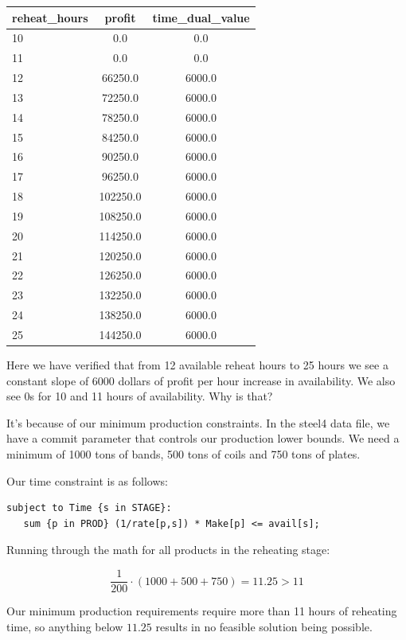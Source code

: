 \begin{table}[!ht]
    \centering
    \begin{tabular}{lcc}
    \hline
        reheat\_hours & profit & time\_dual\_value \\ \hline
        10 & 0.0 & 0.0 \\
        11 & 0.0 & 0.0 \\
        12 & 66250.0 & 6000.0 \\
        13 & 72250.0 & 6000.0 \\
        14 & 78250.0 & 6000.0 \\
        15 & 84250.0 & 6000.0 \\
        16 & 90250.0 & 6000.0 \\
        17 & 96250.0 & 6000.0 \\
        18 & 102250.0 & 6000.0 \\
        19 & 108250.0 & 6000.0 \\
        20 & 114250.0 & 6000.0 \\
        21 & 120250.0 & 6000.0 \\
        22 & 126250.0 & 6000.0 \\
        23 & 132250.0 & 6000.0 \\
        24 & 138250.0 & 6000.0 \\
        25 & 144250.0 & 6000.0 \\
    \hline
    \end{tabular}
\end{table}


Here we have verified that from 12 available reheat hours to 25 hours we see a constant slope of 6000 dollars of profit per hour increase in availability. We also see 0s for 10 and 11 hours of availability. Why is that?

It's because of our minimum production constraints. In the steel4 data file, we have a commit parameter that controls our production lower bounds. We need a minimum of 1000 tons of bands, 500 tons of coils and 750 tons of plates.

Our time constraint is as follows:

\begin{lstlisting}
subject to Time {s in STAGE}:
   sum {p in PROD} (1/rate[p,s]) * Make[p] <= avail[s];
\end{lstlisting}

Running through the math for all products in the reheating stage:

\[
	\frac{1}{200} \cdot (1000 + 500 + 750) = 11.25 > 11
\]

Our minimum production requirements require more than 11 hours of reheating time, so anything below $11.25$ results in no feasible solution being possible.